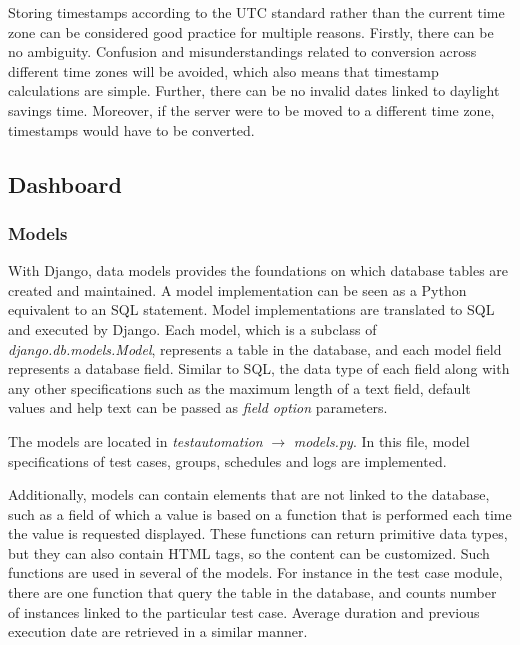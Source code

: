 \noindent Storing timestamps according to the UTC standard rather than the current time zone can be considered good practice for multiple reasons. Firstly, there can be no ambiguity. Confusion and misunderstandings related to conversion across different time zones will be avoided, which also means that timestamp calculations are simple. Further, there can be no invalid dates linked to daylight savings time. Moreover, if the server were to be moved to a different time zone, timestamps would have to be converted.





\subsection{Dashboard}


\subsubsection{Models}

With Django, data models provides the foundations on which database tables are created and maintained. A model implementation can be seen as a Python equivalent to an SQL  statement. Model implementations are translated to SQL and executed by Django. Each model, which is a subclass of \emph{django.db.models.Model}, represents a table in the database, and each model field represents a database field. Similar to SQL, the data type of each field along with any other specifications such as the maximum length of a text field, default values and help text can be passed as \emph{field option} parameters.

The models are located in \emph{testautomation} $\rightarrow$ \emph{models.py}. In this file, model specifications of test cases, groups, schedules and logs are implemented.

Additionally, models can contain elements that are not linked to the database, such as a field of which a value is based on a function that is performed each time the value is requested displayed. These functions can return primitive data types, but they can also contain HTML tags, so the content can be customized. Such functions are used in several of the models. For instance in the test case module, there are one function that query the  table in the database, and counts number of instances linked to the particular test case. Average duration and previous execution date are retrieved in a similar manner.

